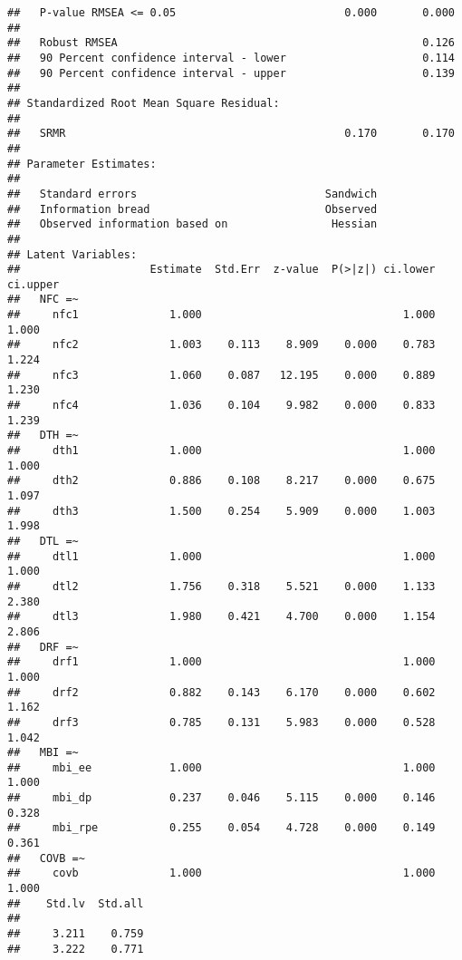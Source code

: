 \documentclass[
  english,
  man]{apa6}
\begin{document}
\begin{verbatim}
##   P-value RMSEA <= 0.05                          0.000       0.000
##                                                                   
##   Robust RMSEA                                               0.126
##   90 Percent confidence interval - lower                     0.114
##   90 Percent confidence interval - upper                     0.139
## 
## Standardized Root Mean Square Residual:
## 
##   SRMR                                           0.170       0.170
## 
## Parameter Estimates:
## 
##   Standard errors                             Sandwich
##   Information bread                           Observed
##   Observed information based on                Hessian
## 
## Latent Variables:
##                    Estimate  Std.Err  z-value  P(>|z|) ci.lower ci.upper
##   NFC =~                                                                
##     nfc1              1.000                               1.000    1.000
##     nfc2              1.003    0.113    8.909    0.000    0.783    1.224
##     nfc3              1.060    0.087   12.195    0.000    0.889    1.230
##     nfc4              1.036    0.104    9.982    0.000    0.833    1.239
##   DTH =~                                                                
##     dth1              1.000                               1.000    1.000
##     dth2              0.886    0.108    8.217    0.000    0.675    1.097
##     dth3              1.500    0.254    5.909    0.000    1.003    1.998
##   DTL =~                                                                
##     dtl1              1.000                               1.000    1.000
##     dtl2              1.756    0.318    5.521    0.000    1.133    2.380
##     dtl3              1.980    0.421    4.700    0.000    1.154    2.806
##   DRF =~                                                                
##     drf1              1.000                               1.000    1.000
##     drf2              0.882    0.143    6.170    0.000    0.602    1.162
##     drf3              0.785    0.131    5.983    0.000    0.528    1.042
##   MBI =~                                                                
##     mbi_ee            1.000                               1.000    1.000
##     mbi_dp            0.237    0.046    5.115    0.000    0.146    0.328
##     mbi_rpe           0.255    0.054    4.728    0.000    0.149    0.361
##   COVB =~                                                               
##     covb              1.000                               1.000    1.000
##    Std.lv  Std.all
##                   
##     3.211    0.759
##     3.222    0.771

\end{verbatim}
\end{document}
